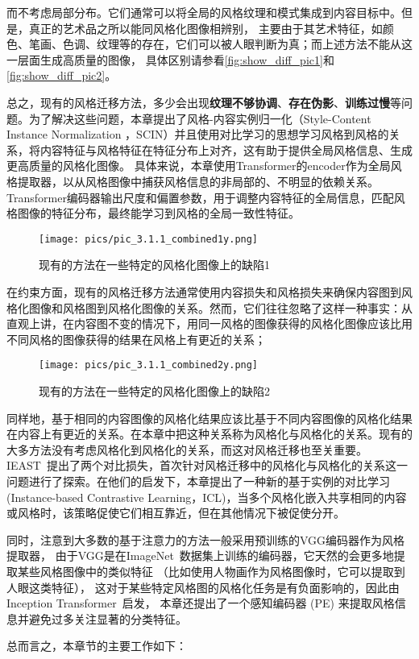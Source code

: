 而不考虑局部分布。它们通常可以将全局的风格纹理和模式集成到内容目标中。但是，真正的艺术品之所以能同风格化图像相辨别，
主要由于其艺术特征，如颜色、笔画、色调、纹理等的存在，它们可以被人眼判断为真；而上述方法不能从这一层面生成高质量的图像，
具体区别请参看\autoref{fig:show_diff_pic1}和\autoref{fig:show_diff_pic2}。
\par 总之，现有的风格迁移方法，多少会出现\textbf{纹理不够协调}、\textbf{存在伪影}、\textbf{训练过慢}等问题。为了解决这些问题，本章提出了风格-内容实例归一化（Style-Content Instance Normalization ，SCIN）并且使用对比学习的思想学习风格到风格的关系，将内容特征与风格特征在特征分布上对齐，这有助于提供全局风格信息、生成更高质量的风格化图像。
具体来说，本章使用Transformer的encoder作为全局风格提取器，以从风格图像中捕获风格信息的非局部的、不明显的依赖关系。Transformer编码器输出尺度和偏置参数，用于调整内容特征的全局信息，匹配风格图像的特征分布，最终能学习到风格的全局一致性特征。
\begin{figure}[htbp]
    \centering
    \texttt{[image: pics/pic\_3.1.1\_combined1y.png]}
    \caption{\label{fig:show_diff_pic1}现有的方法在一些特定的风格化图像上的缺陷1}
\end{figure}
\par 在约束方面，现有的风格迁移方法通常使用内容损失和风格损失来确保内容图到风格化图像和风格图到风格化图像的关系。然而，它们往往忽略了这样一种事实：从直观上讲，在内容图不变的情况下，用同一风格的图像获得的风格化图像应该比用不同风格的图像获得的结果在风格上有更近的关系；

\begin{figure}[htbp]
    \centering
    \texttt{[image: pics/pic\_3.1.1\_combined2y.png]}
    \caption{\label{fig:show_diff_pic2}现有的方法在一些特定的风格化图像上的缺陷2}
\end{figure}同样地，基于相同的内容图像的风格化结果应该比基于不同内容图像的风格化结果在内容上有更近的关系。在本章中把这种关系称为风格化与风格化的关系。现有的大多方法没有考虑风格化到风格化的关系，而这对风格迁移也至关重要。IEAST~\cite{chen2021artistic}提出了两个对比损失，首次针对风格迁移中的风格化与风格化的关系这一问题进行了探索。在他们的启发下，本章提出了一种新的基于实例的对比学习(Instance-based Contrastive Learning，ICL)，当多个风格化嵌入共享相同的内容或风格时，该策略促使它们相互靠近，但在其他情况下被促使分开。
\par 同时，注意到大多数的基于注意力的方法一般采用预训练的VGG编码器作为风格提取器，
由于VGG是在ImageNet~\cite{deng2009imagenet}数据集上训练的编码器，它天然的会更多地提取某些风格图像中的类似特征
（比如使用人物画作为风格图像时，它可以提取到人眼这类特征），
这对于某些特定风格图的风格化任务是有负面影响的，因此由Inception Transformer~\cite{si2022inception}启发，
本章还提出了一个感知编码器 (PE) 来提取风格信息并避免过多关注显著的分类特征。
\par 总而言之，本章节的主要工作如下： 

